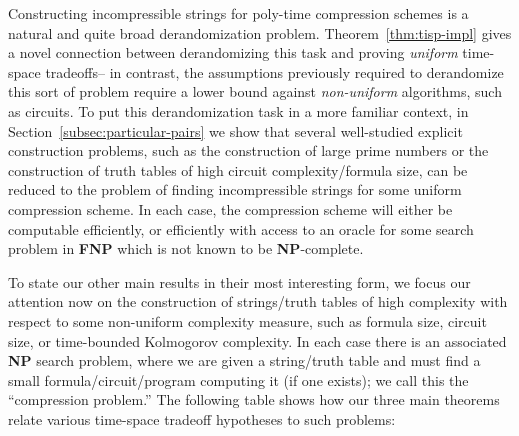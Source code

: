 \documentclass[11pt]{article}
\def\cl{\bf}
\begin{document}
Constructing incompressible strings for poly-time compression schemes is a natural and quite broad derandomization problem. Theorem~\ref{thm:tisp-impl} gives a novel connection between derandomizing this task and proving \emph{uniform} time-space tradeoffs-- in contrast, the assumptions previously required to derandomize this sort of problem require a lower bound against \emph{non-uniform} algorithms, such as circuits. To put this derandomization task in a more familiar context, in Section~\ref{subsec:particular-pairs} we show that several well-studied explicit construction problems, such as the construction of large prime numbers or the construction of truth tables of high circuit complexity/formula size, can be reduced to the problem of finding incompressible strings for some uniform compression scheme. In each case, the compression scheme will either be computable efficiently, or efficiently with access to an oracle for some search problem in {\cl FNP} which is not known to be {\cl NP}-complete. 

To state our other main results in their most interesting form, we focus our attention now on the construction of strings/truth tables of high complexity with respect to some non-uniform complexity measure, such as formula size, circuit size, or time-bounded Kolmogorov complexity. In each case there is an associated {\cl NP} search problem, where we are given a string/truth table and must find a small formula/circuit/program computing it (if one exists); we call this the ``compression problem.'' The following table shows how our three main theorems relate various time-space tradeoff hypotheses to such problems:
\end{document}
